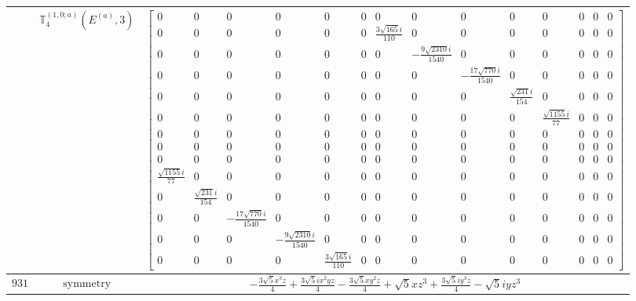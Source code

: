 \documentclass[fleqn,8pt,landscape]{jsarticle}
\begin{document}
\begin{longtable}{ccc}
$  $ & $ \mathbb{T}_{4}^{(1,0;a)}(E^{(a)},3) $ & $ \begin{bmatrix} 0 & 0 & 0 & 0 & 0 & 0 & 0 & 0 & 0 & 0 & 0 & 0 & 0 & 0 \\ 0 & 0 & 0 & 0 & 0 & 0 & \frac{3 \sqrt{165} i}{110} & 0 & 0 & 0 & 0 & 0 & 0 & 0 \\ 0 & 0 & 0 & 0 & 0 & 0 & 0 & - \frac{9 \sqrt{2310} i}{1540} & 0 & 0 & 0 & 0 & 0 & 0 \\ 0 & 0 & 0 & 0 & 0 & 0 & 0 & 0 & - \frac{17 \sqrt{770} i}{1540} & 0 & 0 & 0 & 0 & 0 \\ 0 & 0 & 0 & 0 & 0 & 0 & 0 & 0 & 0 & \frac{\sqrt{231} i}{154} & 0 & 0 & 0 & 0 \\ 0 & 0 & 0 & 0 & 0 & 0 & 0 & 0 & 0 & 0 & \frac{\sqrt{1155} i}{77} & 0 & 0 & 0 \\ 0 & 0 & 0 & 0 & 0 & 0 & 0 & 0 & 0 & 0 & 0 & 0 & 0 & 0 \\ 0 & 0 & 0 & 0 & 0 & 0 & 0 & 0 & 0 & 0 & 0 & 0 & 0 & 0 \\ 0 & 0 & 0 & 0 & 0 & 0 & 0 & 0 & 0 & 0 & 0 & 0 & 0 & 0 \\ \frac{\sqrt{1155} i}{77} & 0 & 0 & 0 & 0 & 0 & 0 & 0 & 0 & 0 & 0 & 0 & 0 & 0 \\ 0 & \frac{\sqrt{231} i}{154} & 0 & 0 & 0 & 0 & 0 & 0 & 0 & 0 & 0 & 0 & 0 & 0 \\ 0 & 0 & - \frac{17 \sqrt{770} i}{1540} & 0 & 0 & 0 & 0 & 0 & 0 & 0 & 0 & 0 & 0 & 0 \\ 0 & 0 & 0 & - \frac{9 \sqrt{2310} i}{1540} & 0 & 0 & 0 & 0 & 0 & 0 & 0 & 0 & 0 & 0 \\ 0 & 0 & 0 & 0 & \frac{3 \sqrt{165} i}{110} & 0 & 0 & 0 & 0 & 0 & 0 & 0 & 0 & 0 \end{bmatrix} $ \\ \hline
$ 931 $ & $ \text{symmetry} $ & $ - \frac{3 \sqrt{5} x^{3} z}{4} + \frac{3 \sqrt{5} i x^{2} y z}{4} - \frac{3 \sqrt{5} x y^{2} z}{4} + \sqrt{5} x z^{3} + \frac{3 \sqrt{5} i y^{3} z}{4} - \sqrt{5} i y z^{3} $ \\

\end{longtable}
\end{document}
